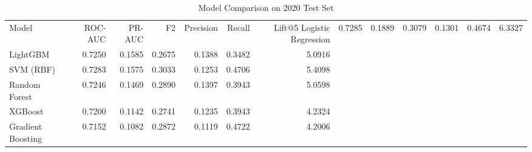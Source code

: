 \begin{table}
\caption{Model Comparison on 2020 Test Set}
\label{tab:models}
\begin{tabular}{lrrrrrr}
\toprule
Model & ROC-AUC & PR-AUC & F2 & Precision & Recall & Lift@5%
\midrule
Logistic Regression & 0.7285 & 0.1889 & 0.3079 & 0.1301 & 0.4674 & 6.3327 \\
LightGBM & 0.7250 & 0.1585 & 0.2675 & 0.1388 & 0.3482 & 5.0916 \\
SVM (RBF) & 0.7283 & 0.1575 & 0.3033 & 0.1253 & 0.4706 & 5.4098 \\
Random Forest & 0.7246 & 0.1469 & 0.2890 & 0.1397 & 0.3943 & 5.0598 \\
XGBoost & 0.7200 & 0.1142 & 0.2741 & 0.1235 & 0.3943 & 4.2324 \\
Gradient Boosting & 0.7152 & 0.1082 & 0.2872 & 0.1119 & 0.4722 & 4.2006 \\
\bottomrule
\end{tabular}
\end{table}
